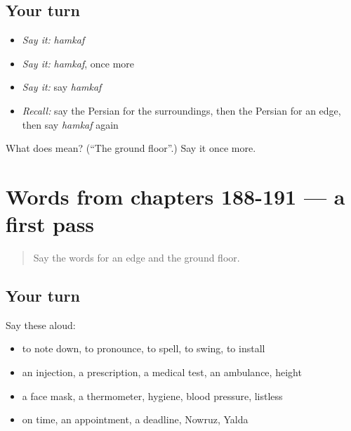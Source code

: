 \subsection*{Your turn}
\begin{itemize}
\raggedright
  \item \emph{Say it:} \emph{hamkaf}
  \item \emph{Say it:} \emph{hamkaf}, once more
  \item \emph{Say it:} say \emph{hamkaf}
  \item \emph{Recall:} say the Persian for the surroundings, then the Persian for an edge, then say \emph{hamkaf} again
\end{itemize}

\begin{tcolorbox}[breakable,colback=teal!4,colframe=teal!35!black,title={Before you move on}]
What does  mean? (\textquotedblleft{}The ground floor\textquotedblright{}.) Say it once more.
\end{tcolorbox}
\section[(dialogue)]{Words from chapters 188-191 — a first pass}

\label{lesson:FA-R196-first-pass-words-from-chapters-188-191}



\begin{quote}
Say the words for an edge and the ground floor.
\end{quote}

\subsection*{Your turn}
Say these aloud:

\begin{itemize}
\raggedright
  \item to note down, to pronounce, to spell, to swing, to install
  \item an injection, a prescription, a medical test, an ambulance, height
  \item a face mask, a thermometer, hygiene, blood pressure, listless
  \item on time, an appointment, a deadline, Nowruz, Yalda
\end{itemize}

